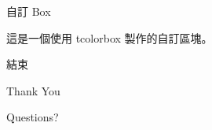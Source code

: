 \documentclass[aspectratio=169]{beamer}
\begin{document}
\begin{frame}{自訂 Box}
    \begin{tcolorbox}[
        colback=myGray,
        colframe=myBlue,
        title=Custom Box
    ]
        這是一個使用 tcolorbox 製作的自訂區塊。
    \end{tcolorbox}
\end{frame}


\begin{frame}{結束}

    \centering

    \Huge
    Thank You

    \bigskip

    \large
    Questions?

\end{frame}
\end{document}
